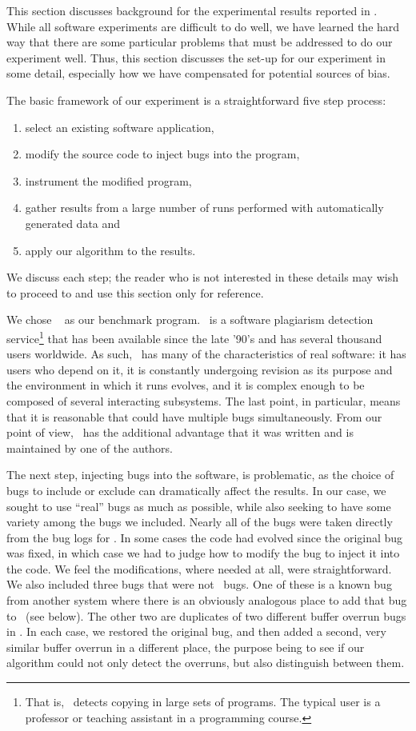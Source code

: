 This section discusses background for the experimental results
reported in .  While all software
experiments are difficult to do well, we have learned the hard way
that there are some particular problems that must be addressed to do
our experiment well.  Thus, this section discusses the set-up for our
experiment in some detail, especially how we have compensated for
potential sources of bias. 

The basic framework of our experiment is a straightforward five step
process: 
\begin{enumerate}
\item select an existing software application, 
\item modify the source code to inject bugs into the program, 
\item instrument the modified program,
\item gather results from a large number of runs performed with automatically generated data and 
\item apply our algorithm to the results.  
\end{enumerate}
We discuss each step; the reader who is not interested in
these details may wish to proceed to  and
use this section only for reference.

We chose \moss\ \cite{Schleimer:2003:WLA} as our benchmark program.  \moss\ is a
software plagiarism detection service\footnote{That is,
\moss\ detects copying in large sets of programs.  The typical \moss
user is a professor or teaching assistant in a programming course.}
that has been available since the late '90's and has several thousand
users worldwide.  As such, \moss\ has many of the characteristics of
real software: it has users who depend on it, it is constantly
undergoing revision as its purpose and the environment in which it
runs evolves, and it is complex enough to be composed of several
interacting subsystems.  The last point, in particular, means that it
is reasonable that \moss could have multiple bugs simultaneously.
From our point of view, \moss\ has the additional advantage that it
was written and is maintained by one of the authors.

The next step, injecting bugs into the software, is problematic, as
the choice of bugs to include or exclude can dramatically affect the
results.  In our case, we sought to use ``real'' bugs as much as
possible, while also seeking to have some variety among the bugs we
included.  Nearly all of the bugs were taken directly from the bug
logs for \moss.  In some cases the code had evolved since the original
bug was fixed, in which case we had to judge how to modify the
bug to inject it into the code.  We feel the modifications, where
needed at all, were straightforward.  We also included three bugs that
were not \moss\ bugs.  One of these is a known bug from another system
where there is an obviously analogous place to add that bug to \moss\
(see below). The other two are duplicates of two different buffer
overrun bugs in \moss.  In each case, we restored the original bug,
and then added a second, very similar buffer overrun in a different
place, the purpose being to see if our algorithm could not only detect
the overruns, but also distinguish between them.

